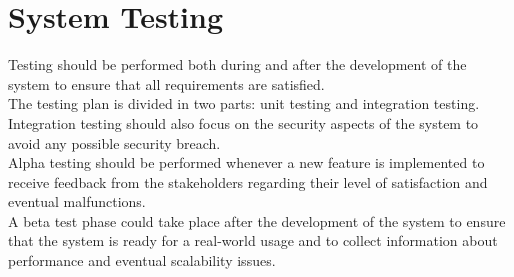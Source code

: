 \section{System Testing}
Testing should be performed both during and after the development of the system to ensure that all requirements 
are satisfied.\\
The testing plan is divided in two parts: unit testing and integration testing. Integration testing should also 
focus on the security aspects of the system to avoid any possible security breach.\\
Alpha testing should be performed whenever a new feature is implemented to receive feedback from the stakeholders 
regarding their level of satisfaction and eventual malfunctions.\\
A beta test phase could take place after the development of the system to ensure that the system is ready for 
a real-world usage and to collect information about performance and eventual scalability issues.\\